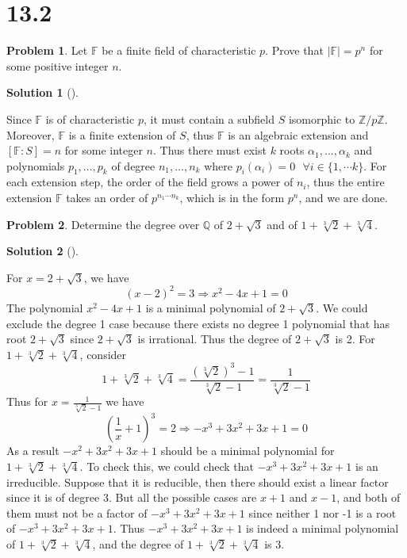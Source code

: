 \documentclass{article}
\newcommand{\sfa}{\text{  } \forall}
\theoremstyle{definition}
\newtheorem{prob}{Problem}
\newtheorem*{sol}{Solution}
\newenvironment{sols}[1][]{%
  \begin{sol}[#1]$ $\par\nobreak\ignorespaces
}{%
  \end{sol}
}
\begin{document}
\section*{13.2}

\setcounter{prob}{0}
\begin{prob}
	Let $\mathbb{F}$ be a finite field of characteristic $p$. 
	Prove that $|\mathbb{F}| = p^n$ for some positive integer $n$.
\end{prob}

\begin{sols}
	Since $\mathbb{F}$ is of characteristic $p$, it must contain a subfield $S$ isomorphic to $\mathbb{Z}/p \mathbb{Z}$.
	Moreover, $\mathbb{F}$ is a finite extension of $S$, thus $\mathbb{F}$ is an algebraic extension and $[\mathbb{F}:S] = n$ for some integer $n$.
	Thus there must exist $k$ roots $\alpha_1, ..., \alpha_k$ and polynomials $p_1, ..., p_k$ of degree $n_1, ..., n_k$ where $p_i(\alpha_i) = 0 \sfa i \in \{1, \cdots k\}$.
	For each extension step, the order of the field grows a power of $n_i$, thus the entire extension $\mathbb{F}$ takes an order of $p^{n_1 \cdots n_k}$, which is in the form $p^n$, and we are done.
\end{sols}

\setcounter{prob}{3}
\begin{prob}
	Determine the degree over $\mathbb{Q}$ of $2 + \sqrt{3}$ and of $1 + \sqrt[3]{2} + \sqrt[3]{4}$.
\end{prob}

\begin{sols}
	For $x = 2 + \sqrt{3}$, we have
	\[
		(x - 2)^2 = 3 \Rightarrow x^2 - 4x + 1 = 0
	\]
	The polynomial $x^2 - 4x + 1$ is a minimal polynomial of $2 + \sqrt{3}$. 
	We could exclude the degree 1 case because there exists no degree 1 polynomial that has root $2 + \sqrt{3}$ since $2 + \sqrt{3}$ is irrational.
	Thus the degree of $2 + \sqrt{3}$ is 2.
	For $1 + \sqrt[3]{2} + \sqrt[3]{4}$, consider
	\[
		1 + \sqrt[3]{2} + \sqrt[3]{4} = \frac{(\sqrt[3]{2})^3 - 1}{\sqrt[3]{2} - 1} = \frac{1}{\sqrt[3]{2} - 1}
	\]
	Thus for $x = \frac{1}{\sqrt[3]{2} - 1}$ we have
	\[
		(\frac{1}{x} + 1)^3 = 2 \Rightarrow -x^3 + 3x^2 + 3x + 1 = 0
	\]
	As a result $-x^2 + 3x^2 + 3x + 1$ should be a minimal polynomial for $1 + \sqrt[3]{2} + \sqrt[3]{4}$.
	To check this, we could check that $-x^3 + 3x^2 + 3x + 1$ is an irreducible.
	Suppose that it is reducible, then there should exist a linear factor since it is of degree 3.
	But all the possible cases are $x + 1$ and $x - 1$, and both of them must not be a factor of $-x^3 + 3x^2 + 3x + 1$ since neither 1 nor -1 is a root of $-x^3 + 3x^2 + 3x + 1$.
	Thus $-x^3 + 3x^2 + 3x + 1$ is indeed a minimal polynomial of $1 + \sqrt[3]{2} + \sqrt[3]{4}$, and the degree of $1 + \sqrt[3]{2} + \sqrt[3]{4}$ is 3. 
\end{sols}
\end{document}

